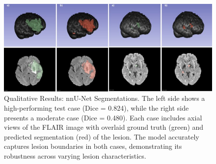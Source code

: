 \documentclass[12pt]{article}
\begin{document}
\begin{figure}[tp]    
    \centering
    \includegraphics[width=\textwidth]{figures/Figure 4.jpg}
    \caption{Qualitative Results: nnU-Net Segmentations. The left side shows a high-performing test case (Dice = 0.824), while the right side presents a moderate case (Dice = 0.480). Each case includes axial views of the FLAIR image with overlaid ground truth (green) and predicted segmentation (red) of the lesion. The model accurately captures lesion boundaries in both cases, demonstrating its robustness across varying lesion characteristics.}
    \label{fig:nnunet_qualitative}
\end{figure}

\end{document}
